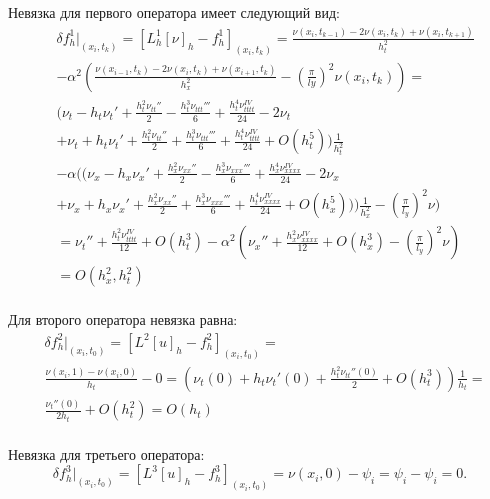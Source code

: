 {{		Невязка для первого оператора имеет следующий вид:
		\begin{align}
 &\delta f^1_h|_{ (x_i, t_k ) } = [ L^1_h[\nu]_h - f^1_h ]_{ (x_i, t_k ) } = \frac{\nu(x_i, t_{k-1})-2\nu(x_i, t_k)+\nu(x_i, t_{k+1})}{h^{2}_t}\nonumber\\
			 & - \alpha^2\left(\frac{\nu(x_{i-1}, t_{k})-2\nu(x_i, t_k)+\nu(x_{i+1}, t_{k})}{h^{2}_x} - \left(\frac{\pi}{ly}\right)^2\nu(x_i, t_k)\right) = \nonumber\\
			 & (\nu_t-h_t\nu_t'+\frac{h^2_t\nu_{tt}''}{2}-\frac{h^3_t\nu_{ttt}'''}{6}+\frac{h^4_t\nu_{tttt}^{IV}}{24}-2\nu_t\nonumber\\ 
			& + \nu_t+h_t\nu_t'+\frac{h^2_t\nu_{tt}''}{2}+\frac{h^3_t\nu_{ttt}'''}{6}+\frac{h^4_t\nu_{tttt}^{IV}}{24}+ O(h^5_t))\frac{1}{h^2_t}\nonumber\\ 
			 & -\alpha((\nu_x-h_x\nu_x'+\frac{h^2_x\nu_{xx}''}{2}-\frac{h^3_x\nu_{xxx}'''}{6}+\frac{h^4_x\nu_{xxxx}^{IV}}{24}-2\nu_x\nonumber\\ 
			& + \nu_x+h_x\nu_x'+\frac{h^2_x\nu_{xx}''}{2}+\frac{h^3_x\nu_{xxx}'''}{6}+\frac{h^4_t\nu_{xxxx}^{IV}}{24}+ O(h^5_x)))\frac{1}{h^2_x} - \left(\frac{\pi}{l_y}\right)^2 \nu)\nonumber\\ 		
			& = \nu_t'' + \frac{h^2_t\nu^{IV}_{tttt}}{12} + O(h^3_t) - \alpha^2\left(\nu_x'' + \frac{h^2_x\nu^{IV}_{xxxx}}{12} + O(h^3_x) -\left(\frac{\pi}{l_y}\right)^2 \nu\right)\nonumber\\
			&= O(h^2_x, h^2_t)\nonumber\\
		\end{align}
		
		Для второго оператора невязка равна:
		\begin{equation}
		\begin{split}
			&\delta f^2_h|_{ (x_i, t_0 ) } = [L^2[u]_h - f^2_h]_{ (x_i, t_0 ) } = \\
			&\frac{\nu(x_i, 1) - \nu(x_i, 0)}{h_t} - 0 = 
			\left(\nu_t(0)+h_t\nu_t'(0)+\frac{h^2_t\nu_{tt}''(0)}{2} + O(h^3_t)\right)\frac{1}{h_t} = \nonumber\\
			&\frac{\nu_t''(0)}{2h_t} + O(h^2_t) = O(h_t)\nonumber\\
		\end{split}
		\end{equation}

		Невязка для третьего оператора:
		\begin{equation}
			\delta f^3_h|_{ (x_i, t_0 ) } = [L^3[u]_h - f^3_h]_{ (x_i, t_0 ) } = \nu(x_i , 0) - \psi_i = \psi_i - \psi_i = 0\nonumber.
		\end{equation}
		
}}
